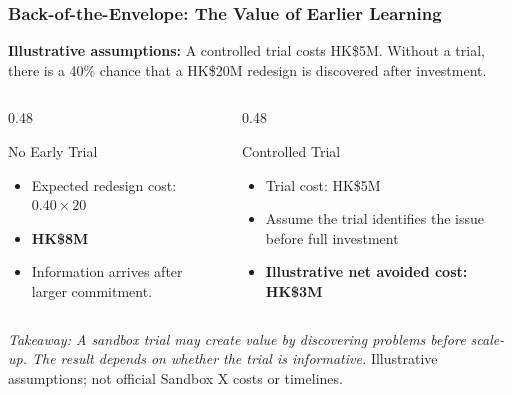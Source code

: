 \documentclass{beamer}
\begin{document}
\begin{frame}[t,shrink=10]
\frametitle{Back-of-the-Envelope: The Value of Earlier Learning}
\textbf{Illustrative assumptions:} A controlled trial costs HK\$5M. Without a trial, there is a 40\% chance that a HK\$20M redesign is discovered after investment.
\begin{columns}[T]
\begin{column}{0.48\textwidth}\begin{block}{No Early Trial}
\begin{itemize}
\item Expected redesign cost: $0.40\times20$
\item \textbf{HK\$8M}
\item Information arrives after larger commitment.
\end{itemize}\end{block}\end{column}
\begin{column}{0.48\textwidth}\begin{block}{Controlled Trial}
\begin{itemize}
\item Trial cost: HK\$5M
\item Assume the trial identifies the issue before full investment
\item \textbf{Illustrative net avoided cost: HK\$3M}
\end{itemize}\end{block}\end{column}
\end{columns}
\textit{Takeaway: A sandbox trial may create value by discovering problems before scale-up. The result depends on whether the trial is informative.}
\vfill{\tiny Illustrative assumptions; not official Sandbox X costs or timelines.}
\end{frame}
\end{document}
